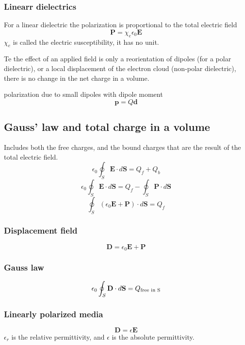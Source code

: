 \documentclass[
12pt, reprint, aip, onecolumn, notitlepage
]{revtex4-1}
\begin{document}
\subsubsection{Linearr dielectrics}
For a linear dielectric the polarization is proportional to the total electric field
\begin{equation}
	\mathbf{P} = \chi_e\epsilon_0\mathbf{E}
\end{equation}
$\chi_e$ is called the electric susceptibility, it has no unit.


Te the effect of an applied field is only a reorientation of dipoles
(for a polar dielectric), or a local displacement of the electron cloud
(non-polar dielectric), there is no change in the net charge in a volume.

polarization due to small dipoles with dipole moment 
\begin{equation}
	\mathbf{p} = Q\mathbf{d}
\end{equation}
\subsection{Gauss' law and total charge in a volume}
Includes both the free charges, and the bound charges that are the result of the total electric field. 
\begin{equation}
	\epsilon_0\oint_S \mathbf{E} \cdot d\mathbf{S} =Q_f + Q_b
\end{equation}
\begin{equation}
	\epsilon_0\oint_S \mathbf{E} \cdot d\mathbf{S} =Q_f - \oint_S \mathbf{P}\cdot d\mathbf{S}
\end{equation}
\begin{equation}
\oint_S (\epsilon_0\mathbf{E} +\mathbf{P})\cdot d\mathbf{S} =Q_f
\end{equation}
\subsubsection{Displacement field}
\begin{equation}
	\mathbf{D} = \epsilon_0\mathbf{E} +\mathbf{P}
\end{equation}
\subsubsection{Gauss law}
\begin{equation}
	\epsilon_0\oint_S \mathbf{D} \cdot d\mathbf{S} =Q_{\textnormal{free in S}}
\end{equation}
\subsubsection{Linearly polarized media}
\begin{equation}
	\mathbf{D} = \epsilon\mathbf{E}
\end{equation}
$\epsilon_r$ is the relative permittivity, and $\epsilon$ is the absolute permittivity. 
\end{document}
